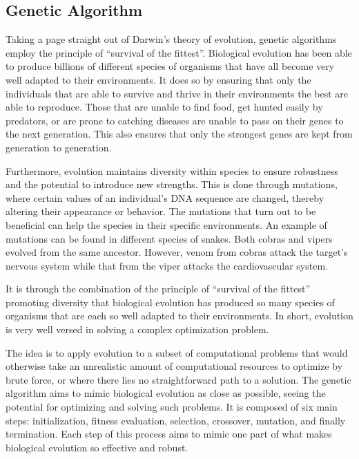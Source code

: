 \documentclass[12pt]{article}
\begin{document}
\subsection{Genetic Algorithm}

Taking a page straight out of Darwin's theory of evolution, genetic algorithms employ the principle of ``survival of the fittest''. Biological evolution has been able to produce billions \cite{Sweetlove_2011} of different species of organisms that have all become very well adapted to their environments. It does so by ensuring that only the individuals that are able to survive and thrive in their environments the best are able to reproduce. Those that are unable to find food, get hunted easily by predators, or are prone to catching diseases are unable to pass on their genes to the next generation. This also ensures that only the strongest genes are kept from generation to generation.

Furthermore, evolution maintains diversity within species to ensure robustness and the potential to introduce new strengths. This is done through mutations, where certain values of an individual's DNA sequence are changed, thereby altering their appearance or behavior. The mutations that turn out to be beneficial can help the species in their specific environments. An example of mutations can be found in different species of snakes. Both cobras and vipers evolved from the same ancestor. However, venom from cobras attack the target's nervous system while that from the viper attacks the cardiovascular system.

It is through the combination of the principle of ``survival of the fittest'' promoting diversity that biological evolution has produced so many species of organisms that are each so well adapted to their environments. In short, evolution is very well versed in solving a complex optimization problem.

The idea is to apply evolution to a subset of computational problems that would otherwise take an unrealistic amount of computational resources to optimize by brute force, or where there lies no straightforward path to a solution. The genetic algorithm aims to mimic biological evolution as close as possible, seeing the potential for optimizing and solving such problems. It is composed of six main steps: initialization, fitness evaluation, selection, crossover, mutation, and finally termination. Each step of this process aims to mimic one part of what makes biological evolution so effective and robust.
\end{document}
